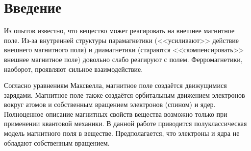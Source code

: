 \section*{Введение}

Из опытов известно, что вещество может реагировать на внешнее магнитное поле. Из-за внутренней структуры парамагнетики (<<усиливают>> действие внешнего магнитного поля) и диамагнетики (стараются <<скомпенсировать>> внешнее магнитное поле) довольно слабо реагируют с полем. Ферромагнетики, наоборот, проявляют сильное взаимодействие.

Согласно уравнениям Максвелла, магнитное поле создаётся движущимися зарядами. Магнитное поле также создаётся орбитальным движением электронов вокруг атомов и собственным вращением электронов (спином) и ядер. Полноценное описание магнитных свойств вещества возможно только при применении квантовой механики. В данной работе приводится полуклассическая модель магнитного поля в веществе. Предполагается, что электроны и ядра не обладают собственным вращением.